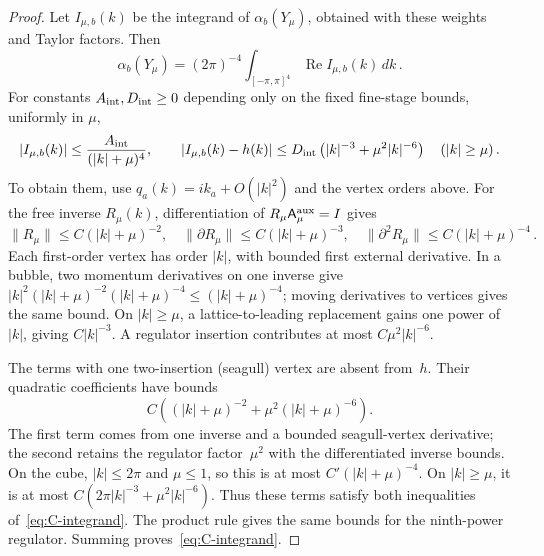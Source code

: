 \begin{proof}
Let $I_{\mu,b}(k)$ be the integrand of $\alpha_b(Y_\mu)$, obtained with these weights and Taylor factors. Then
\begin{equation*}
\alpha_b(Y_\mu)=(2\pi)^{-4}\int_{[-\pi,\pi]^4}\operatorname{Re}I_{\mu,b}(k)\,dk\,.
\end{equation*}
For constants $A_{\rm int},D_{\rm int}\ge0$ depending only on the fixed fine-stage bounds, uniformly in $\mu$,
\begin{equation}\label{eq:C-integrand}
|I_{\mu,b}(k)|\le\frac{A_{\rm int}}{(|k|+\mu)^4},\qquad
|I_{\mu,b}(k)-h(k)|\le D_{\rm int}\left(|k|^{-3}+\mu^2|k|^{-6}\right)\quad(|k|\ge\mu)\,.
\end{equation}
To obtain them, use $q_a(k)=ik_a+O(|k|^2)$ and the vertex orders above. For the free inverse $R_\mu(k)$, differentiation of $R_\mu\mathsf A^{\rm aux}_\mu=I$ gives
\begin{equation*}
\|R_\mu\|\le C(|k|+\mu)^{-2},\quad
\|\partial R_\mu\|\le C(|k|+\mu)^{-3},\quad
\|\partial^2R_\mu\|\le C(|k|+\mu)^{-4}\,.
\end{equation*}
Each first-order vertex has order $|k|$, with bounded first external derivative. In a bubble, two momentum derivatives on one inverse give $|k|^2(|k|+\mu)^{-2}(|k|+\mu)^{-4}\le(|k|+\mu)^{-4}$; moving derivatives to vertices gives the same bound. On $|k|\ge\mu$, a lattice-to-leading replacement gains one power of~$|k|$, giving $C|k|^{-3}$. A regulator insertion contributes at most $C\mu^2|k|^{-6}$.

The terms with one two-insertion (seagull) vertex are absent from~$h$. Their quadratic coefficients have bounds
\begin{equation*}
C\left((|k|+\mu)^{-2}+\mu^2(|k|+\mu)^{-6}\right).
\end{equation*}
The first term comes from one inverse and a bounded seagull-vertex derivative; the second retains the regulator factor~$\mu^2$ with the differentiated inverse bounds. On the cube, $|k|\le2\pi$ and $\mu\le1$, so this is at most $C'(|k|+\mu)^{-4}$. On $|k|\ge\mu$, it is at most $C(2\pi|k|^{-3}+\mu^2|k|^{-6})$. Thus these terms satisfy both inequalities of~\eqref{eq:C-integrand}. The product rule gives the same bounds for the ninth-power regulator. Summing proves~\eqref{eq:C-integrand}.


\end{proof}
